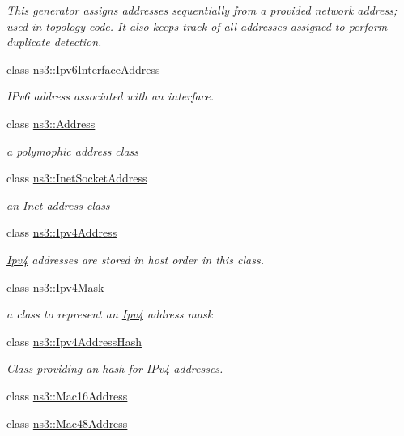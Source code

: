 \begin{DoxyCompactItemize}
\begin{DoxyCompactList}\small\item\em This generator assigns addresses sequentially from a provided network address; used in topology code. It also keeps track of all addresses assigned to perform duplicate detection. \end{DoxyCompactList}\item 
class \hyperlink{classns3_1_1Ipv6InterfaceAddress}{ns3\+::\+Ipv6\+Interface\+Address}
\begin{DoxyCompactList}\small\item\em I\+Pv6 address associated with an interface. \end{DoxyCompactList}\item 
class \hyperlink{classns3_1_1Address}{ns3\+::\+Address}
\begin{DoxyCompactList}\small\item\em a polymophic address class \end{DoxyCompactList}\item 
class \hyperlink{classns3_1_1InetSocketAddress}{ns3\+::\+Inet\+Socket\+Address}
\begin{DoxyCompactList}\small\item\em an Inet address class \end{DoxyCompactList}\item 
class \hyperlink{classns3_1_1Ipv4Address}{ns3\+::\+Ipv4\+Address}
\begin{DoxyCompactList}\small\item\em \hyperlink{classns3_1_1Ipv4}{Ipv4} addresses are stored in host order in this class. \end{DoxyCompactList}\item 
class \hyperlink{classns3_1_1Ipv4Mask}{ns3\+::\+Ipv4\+Mask}
\begin{DoxyCompactList}\small\item\em a class to represent an \hyperlink{classns3_1_1Ipv4}{Ipv4} address mask \end{DoxyCompactList}\item 
class \hyperlink{classns3_1_1Ipv4AddressHash}{ns3\+::\+Ipv4\+Address\+Hash}
\begin{DoxyCompactList}\small\item\em Class providing an hash for I\+Pv4 addresses. \end{DoxyCompactList}\item 
class \hyperlink{classns3_1_1Mac16Address}{ns3\+::\+Mac16\+Address}
\item 
class \hyperlink{classns3_1_1Mac48Address}{ns3\+::\+Mac48\+Address}

\end{DoxyCompactItemize}
